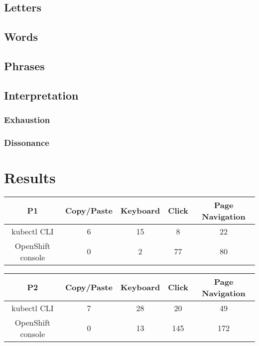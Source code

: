 \documentclass[11pt, oneside]{article}   	%
\begin{document}
\subsection{Letters}
\subsection{Words}
\subsection{Phrases}
\subsection{Interpretation}
\subsubsection{Exhaustion}
\subsubsection{Dissonance}

\section{Results}


\begin{center}
\begin{tabular}{ | c | c | c | c | c | } 
  \hline
  P1 & Copy/Paste & Keyboard & Click & Page Navigation \\ 
  \hline
  kubectl CLI & 6 & 15 & 8 & 22 \\ 
  \hline
  OpenShift console & 0 & 2 & 77 & 80 \\ 
  \hline
\end{tabular}
\end{center}

\begin{center}
\begin{tabular}{ | c | c | c | c | c | } 
  \hline
  P2 & Copy/Paste & Keyboard & Click & Page Navigation \\ 
  \hline
  kubectl CLI & 7 & 28 & 20 & 49 \\ 
  \hline
  OpenShift console & 0 & 13 & 145 & 172 \\ 
  \hline
\end{tabular}
\end{center}
\end{document}
